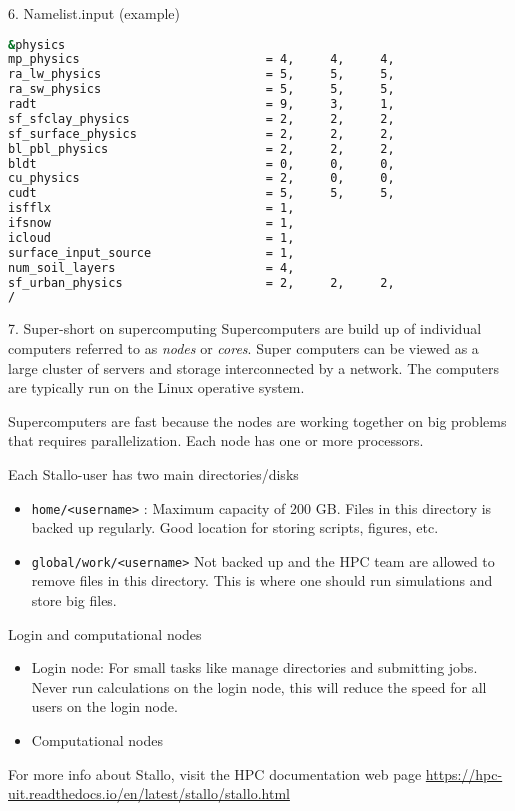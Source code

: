 \documentclass{beamer}
\begin{document}
\begin{frame}[fragile, allowframebreaks=.95, t]{6. Namelist.input (example)}
\begin{lstlisting}[backgroundcolor = \color{light-gray}, language=bash]
&physics
mp_physics                          = 4,     4,     4,
ra_lw_physics                       = 5,     5,     5,
ra_sw_physics                       = 5,     5,     5,
radt                                = 9,     3,     1,
sf_sfclay_physics                   = 2,     2,     2,
sf_surface_physics                  = 2,     2,     2,
bl_pbl_physics                      = 2,     2,     2,
bldt                                = 0,     0,     0,
cu_physics                          = 2,     0,     0,
cudt                                = 5,     5,     5,
isfflx                              = 1,
ifsnow                              = 1,
icloud                              = 1,
surface_input_source                = 1,
num_soil_layers                     = 4,
sf_urban_physics                    = 2,     2,     2,
/
\end{lstlisting}
\end{frame}




\begin{frame}[fragile, allowframebreaks=.9, t]{7. Super-short on supercomputing}
Supercomputers are build up of individual computers referred to as \textit{nodes} or \textit{cores}. Super computers can be viewed as a large cluster of servers and storage interconnected by a network. The computers are typically run on the Linux operative system. 

Supercomputers are fast because the nodes are working together on big problems that requires parallelization.  Each node has one or more processors. 


Each Stallo-user has two main directories/disks
\begin{itemize}
	\item \texttt{home/<username>} : Maximum capacity of 200 GB. Files in this directory is backed up regularly. Good location for storing scripts, figures, etc. 
	\item \texttt{global/work/<username>} Not backed up and the HPC team are allowed to remove files in this directory. This is where one should run simulations and store big files. 
\end{itemize}

Login and computational nodes
\begin{itemize}
	\item Login node: For small tasks like  manage directories and submitting jobs. Never run calculations on the login node, this will reduce the speed for all users on the login node. 
	\item Computational nodes
\end{itemize}


For more info about Stallo, visit the HPC documentation web page \url{https://hpc-uit.readthedocs.io/en/latest/stallo/stallo.html}
\end{frame}
\end{document}
